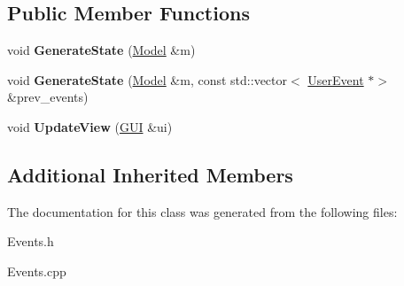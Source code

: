 \subsection*{Public Member Functions}
\begin{DoxyCompactItemize}
\item 
\mbox{\label{classSaveButtonClick_af54ca18155e6a8f40e55d80a825cdd8e}} 
void {\bfseries Generate\+State} (\hyperlink{classModel}{Model} \&m)
\item 
\mbox{\label{classSaveButtonClick_a0db27b6afd24cd8533c916159d20f758}} 
void {\bfseries Generate\+State} (\hyperlink{classModel}{Model} \&m, const std\+::vector$<$ \hyperlink{classUserEvent}{User\+Event} $\ast$$>$ \&prev\+\_\+events)
\item 
\mbox{\label{classSaveButtonClick_a0317281e7e59a36f12c88699cab36572}} 
void {\bfseries Update\+View} (\hyperlink{classGUI}{G\+UI} \&ui)
\end{DoxyCompactItemize}
\subsection*{Additional Inherited Members}


The documentation for this class was generated from the following files\+:\begin{DoxyCompactItemize}
\item 
Events.\+h\item 
Events.\+cpp\end{DoxyCompactItemize}
